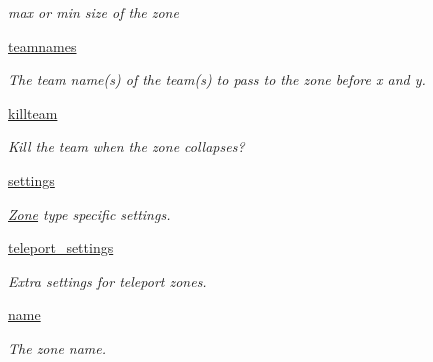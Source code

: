 \begin{DoxyCompactItemize}
\begin{DoxyCompactList}\small\item\em max or min size of the zone \item\end{DoxyCompactList}\item 
\hyperlink{class_zone_1_1_zone_a0f3f8429ae8a37672f700da3f2805a91}{teamnames}
\begin{DoxyCompactList}\small\item\em The team name(s) of the team(s) to pass to the zone before x and y. \item\end{DoxyCompactList}\item 
\hyperlink{class_zone_1_1_zone_a45db96faa826bf1e485c70da9c07d83e}{killteam}
\begin{DoxyCompactList}\small\item\em Kill the team when the zone collapses? \item\end{DoxyCompactList}\item 
\hyperlink{class_zone_1_1_zone_a57b65c53ff747cf9504c88ff37d7b9ee}{settings}
\begin{DoxyCompactList}\small\item\em \hyperlink{class_zone_1_1_zone}{Zone} type specific settings. \item\end{DoxyCompactList}\item 
\hyperlink{class_zone_1_1_zone_a2b9ae272876347626e25ead4d48f9a97}{teleport\_\-settings}
\begin{DoxyCompactList}\small\item\em Extra settings for teleport zones. \item\end{DoxyCompactList}\item 
\hyperlink{class_zone_1_1_zone_ad03356df7f4de16fb473ba7bd8fbe2c8}{name}
\begin{DoxyCompactList}\small\item\em The zone name. \item\end{DoxyCompactList}\end{DoxyCompactItemize}
